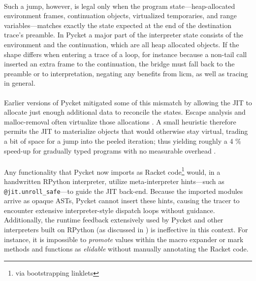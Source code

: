 	\paragraph{}%
		Such a jump, however, is legal only when the program state—heap-allocated environment frames, continuation objects, virtualized temporaries, and range variables—matches exactly the state expected at the end of the destination trace's preamble. In Pycket a major part of the interpreter state consists of the environment and the continuation, which are all heap allocated objects. If the shape differs when entering a trace of a loop, for instance because a non-tail call inserted an extra frame to the continuation, the bridge must fall back to the preamble or to interpretation, negating any benefits from \gls{licm}, as well as tracing in general.

	\paragraph{}%
		Earlier versions of Pycket mitigated some of this mismatch by allowing the JIT to allocate just enough additional data to reconcile the states. Escape analysis and malloc-removal often virtualize those allocations \cite{malloc-removal:11,loop-aware:12}. A small heuristic therefore permits the JIT to materialize objects that would otherwise stay virtual, trading a bit of space for a jump into the peeled iteration; thus yielding roughly a 4 \% speed-up for gradually typed programs with no measurable overhead \cite{pycketmain2}.

	\paragraph{}%
		Any functionality that Pycket now imports as Racket code\footnote{via bootstrapping linklets} would, in a handwritten RPython interpreter, utilize meta-interpreter hints—such as \verb|@jit.unroll_safe|—to guide the JIT back-end. Because the imported modules arrive as opaque ASTs, Pycket cannot insert these hints, causing the tracer to encounter extensive interpreter-style dispatch loops without guidance. Additionally, the runtime feedback extensively used by Pycket and other interpreters built on RPython (as discussed in ) is ineffective in this context. For instance, it is impossible to \emph{promote} values within the macro expander or mark methods and functions as \emph{elidable} without manually annotating the Racket code.

